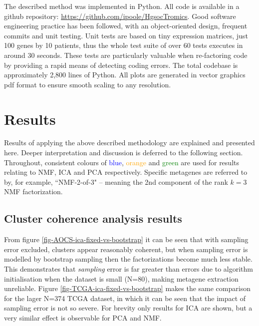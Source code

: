 \documentclass[draft, tikz, 12pt,a4paper,oneside,fleqn]{article}
\begin{document}
The described method was implemented in Python.
All code is available in a github repository: \url{https://github.com/ipoole/HgsocTromics}.  Good software engineering practice has been followed, with an object-oriented design, frequent commits and unit testing.  Unit tests are based on tiny expression matrices, just 100 genes by 10 patients, thus the whole test suite of over 60 tests executes in around 30 seconds.  These tests are particularly valuable when re-factoring code by providing a rapid means of detecting coding errors.  The total codebase is approximately 2,800 lines of Python.  All plots are generated in vector graphics pdf format to ensure smooth scaling to any resolution. 




\section{Results}

Results of applying the above described methodology are explained and presented here.   Deeper interpretation and discussion is deferred to the following section.  Throughout, consistent colours of \textcolor{blue}{blue}, \textcolor{orange}{orange} and \textcolor{green}{green} are used for results relating to NMF, ICA and PCA respectively.  Specific metagenes are referred to by, for example, ``NMF-2-of-3" -- meaning the 2nd component of the rank $k=3$ NMF factorization.

\subsection{Cluster coherence analysis results}

From figure \ref{fig-AOCS-ica-fixed-vs-bootstrap} it can be seen that with sampling error excluded, clusters appear reasonably coherent, but when sampling error is modelled by bootstrap sampling then  the factorizations become much less stable.  This demonstrates that \emph{sampling} error is far greater than errors due to algorithm initialisation when the dataset is small (N=80), making metagene extraction unreliable.   Figure  \ref{fig-TCGA-ica-fixed-vs-bootstrap} makes the same comparison for the lager N=374 TCGA dataset, in which it can be seen that the impact of sampling error is not so severe.  For brevity only results for ICA are shown, but a very similar effect is observable for PCA and NMF.   
\end{document}
